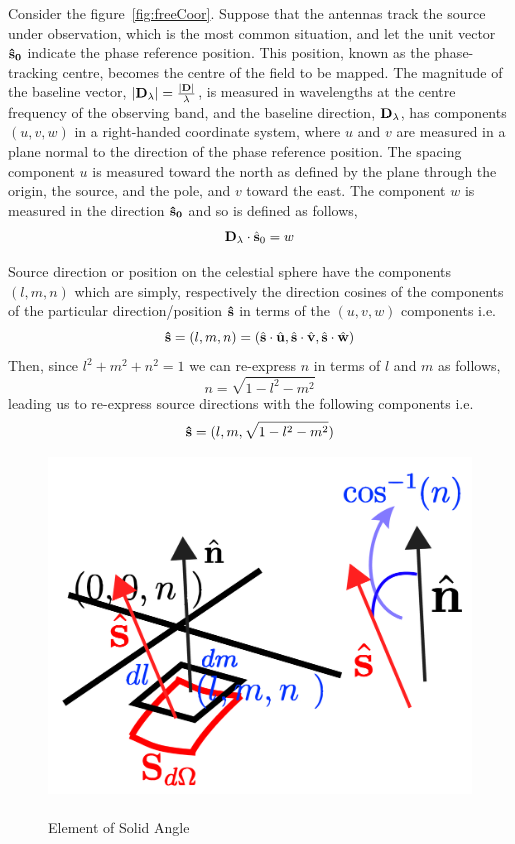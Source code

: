 Consider the figure~\ref{fig:freeCoor}.
Suppose that the antennas track the source under observation, which is the most common situation, and let the unit vector $\bf{\hat{s}}_0$ indicate the phase reference position. This position, known as the phase-tracking centre, becomes the centre of the field to be mapped. The magnitude of the baseline vector, $|{\bf D}_{\lambda}| = \frac{|{\bf D}|}{\lambda}$, is measured in wavelengths at the centre frequency of the observing band, and the baseline direction, ${\bf D}_{\lambda}$, has components $(u, v , w)$ in a right-handed coordinate system, where $u$ and $v$ are measured in a plane normal to the direction of the phase reference position. The spacing component $u$ is measured toward the north as defined by
the plane through the origin, the source, and the pole, and $v$ toward the east. The component $w$ is measured in the direction ${\bf\hat{s}_0}$ and so is defined as follows,
\begin{equation}
{\bf D}_{\lambda}\cdot\hat{\bf s}_{0} = w
\end{equation}

 Source direction or position on the celestial sphere have the components $(l,m,n)$ which are simply,  respectively the direction cosines of the components of the particular direction{/}position ${\bf \hat{s}}$ in terms of the $(u,v,w)$ components i.e. 
\begin{equation}
{\bf \hat{s}} = (l,m,n) = (\hat{\bf s}\cdot\hat{\bf u},\hat{\bf s}\cdot\hat{\bf v},\hat{\bf s}\cdot\hat{\bf w})
\end{equation}
Then, since $l^2 + m^2 + n^2 = 1$ we can re-express $n$ in terms of $l$ and $m$ as follows, 
\begin{equation}
n = \sqrt{1 - l^2 - m^2}
\end{equation}
leading us to re-express source directions with the following components i.e.
\begin{equation}
{\bf \hat{s}} = (l,m, \sqrt{1 - l^2 - m^2})
\end{equation}
\begin{figure}[htbp]
\center
    \includegraphics[scale= 0.5]{Figures/sAngle}
 	\caption[Element of Solid Angle]{\\Element of Solid Angle}
	\label{fig:sAngle}
\end{figure}

